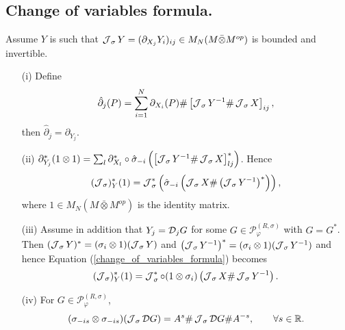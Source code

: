 \subsection{Change of variables formula.}

\begin{lem}\label{change_of_variables}
Assume $Y$ is such that $\operatorname{\mathcal J}_\sigma Y=(\partial_{X_j} Y_i)_{ij}\in M_N(M\bar{\otimes}M^{op})$ is bounded and invertible.
	\begin{enumerate}
	\item[(i)] Define
		\begin{equation*}
			\hat{\partial}_j(P)=\sum_{i=1}^N \partial_{X_i}(P)\#\left[ \operatorname{\mathcal J}_\sigma Y^{-1}\# \operatorname{\mathcal J}_\sigma X\right]_{ij},
		\end{equation*}
	then $\hat{\partial}_j=\partial_{Y_j}$.
	
	\item[(ii)] $\partial_{Y_j}^*(1\otimes 1)=\sum_l \partial_{X_l}^*\circ\hat{\sigma}_{-i}\left(\left[ \operatorname{\mathcal J}_\sigma Y^{-1}\# \operatorname{\mathcal J}_\sigma X\right]_{lj}^*\right)$. Hence
		\begin{equation}\label{change_of_variables_formula}
			(\operatorname{\mathcal J}_\sigma)_Y^*(1)=\operatorname{\mathcal J}_\sigma^*\left(\hat{\sigma}_{-i}\left( \operatorname{\mathcal J}_\sigma X\# \left(\operatorname{\mathcal J}_\sigma Y^{-1}\right)^*\right)\right),
		\end{equation}
	where $1\in M_N(M\bar{\otimes}M^{op})$ is the identity matrix.

	\item[(iii)] Assume in addition that $Y_j=\mathcal D_jG$ for some $G\in\mathscr{P}^{(R,\sigma)}_\varphi$ with $G=G^*$. Then $(\operatorname{\mathcal J}_\sigma Y)^*=(\sigma_i\otimes 1)(\operatorname{\mathcal J}_\sigma Y)$ and $\left(\operatorname{\mathcal J}_\sigma Y^{-1}\right)^*=(\sigma_i\otimes 1)(\operatorname{\mathcal J}_\sigma Y^{-1})$ and hence Equation (\ref{change_of_variables_formula}) becomes
		\begin{equation}\label{change_of_variables_formula_2}
			(\operatorname{\mathcal J}_\sigma)_Y^*(1)=\operatorname{\mathcal J}_\sigma^*\circ (1\otimes \sigma_i)\left( \operatorname{\mathcal J}_\sigma X \# \operatorname{\mathcal J}_\sigma Y^{-1}\right).
		\end{equation}
	
	\item[(iv)] For $G\in\mathscr{P}^{(R,\sigma)}_{\varphi}$,
		\begin{align*}
			(\sigma_{-is}\otimes\sigma_{-is})(\operatorname{\mathcal J}_\sigma\mathcal D G) = A^s\# \operatorname{\mathcal J}_\sigma\mathcal D G \# A^{-s},\qquad \forall s\in\mathbb{R}.
		\end{align*}
	\end{enumerate}
\end{lem}
